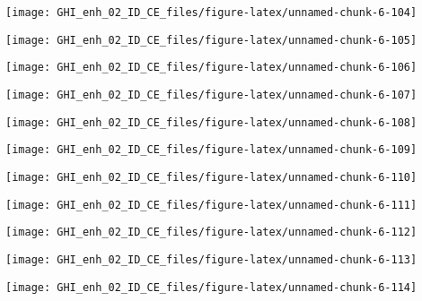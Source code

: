 \documentclass[
  10pt,
  a4paper,oneside]{article}
\begin{document}
\begin{center}\texttt{[image: GHI\_enh\_02\_ID\_CE\_files/figure-latex/unnamed-chunk-6-104]} \end{center}

\begin{center}\texttt{[image: GHI\_enh\_02\_ID\_CE\_files/figure-latex/unnamed-chunk-6-105]} \end{center}

\begin{center}\texttt{[image: GHI\_enh\_02\_ID\_CE\_files/figure-latex/unnamed-chunk-6-106]} \end{center}

\begin{center}\texttt{[image: GHI\_enh\_02\_ID\_CE\_files/figure-latex/unnamed-chunk-6-107]} \end{center}

\begin{center}\texttt{[image: GHI\_enh\_02\_ID\_CE\_files/figure-latex/unnamed-chunk-6-108]} \end{center}

\begin{center}\texttt{[image: GHI\_enh\_02\_ID\_CE\_files/figure-latex/unnamed-chunk-6-109]} \end{center}

\begin{center}\texttt{[image: GHI\_enh\_02\_ID\_CE\_files/figure-latex/unnamed-chunk-6-110]} \end{center}

\begin{center}\texttt{[image: GHI\_enh\_02\_ID\_CE\_files/figure-latex/unnamed-chunk-6-111]} \end{center}

\begin{center}\texttt{[image: GHI\_enh\_02\_ID\_CE\_files/figure-latex/unnamed-chunk-6-112]} \end{center}

\begin{center}\texttt{[image: GHI\_enh\_02\_ID\_CE\_files/figure-latex/unnamed-chunk-6-113]} \end{center}

\begin{center}\texttt{[image: GHI\_enh\_02\_ID\_CE\_files/figure-latex/unnamed-chunk-6-114]} \end{center}
\end{document}
